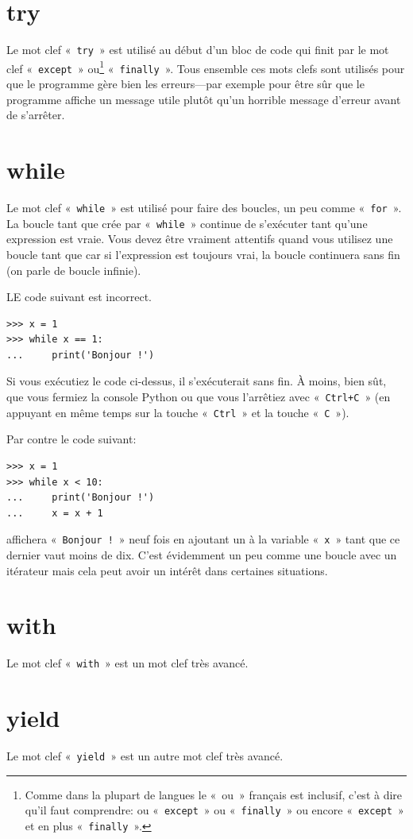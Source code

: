 \section*{try}

Le mot clef « \texttt{try} » est utilisé au début d'un bloc de code qui finit par le mot clef « \texttt{except} » ou\footnote{Comme dans la plupart de langues le « ou » français est inclusif, c'est à dire qu'il faut comprendre: ou « \texttt{except} » ou « \texttt{finally} » ou encore « \texttt{except} » et en plus « \texttt{finally} ».} « \texttt{finally} ». Tous ensemble ces mots clefs sont utilisés pour que le programme gère bien les erreurs---par exemple pour être sûr que le programme affiche un message utile plutôt qu'un horrible message d'erreur avant de s'arrêter.

\section*{while}

Le mot clef « \texttt{while} » est utilisé pour faire des boucles, un peu comme « \texttt{for} ». La boucle tant que crée par « \texttt{while} » continue de s'exécuter tant qu'une expression est vraie. Vous devez être vraiment attentifs quand vous utilisez une boucle tant que car si l'expression est toujours vrai, la boucle continuera sans fin (on parle de boucle infinie).

LE code suivant est incorrect.
\begin{Verbatim}[frame=single,rulecolor=\color{red},label="ne pas taper"]
>>> x = 1
>>> while x == 1:
...     print('Bonjour !')
\end{Verbatim}

Si vous exécutiez le code ci-dessus, il s'exécuterait sans fin. À moins, bien sût, que vous fermiez la console  Python ou que vous l'arrêtiez avec « \texttt{Ctrl+C} » (en appuyant en même temps sur la touche « \texttt{Ctrl} » et la touche « \texttt{C} »).


Par contre le code suivant:

\begin{Verbatim}[frame=single,rulecolor=\color{gray}]
>>> x = 1
>>> while x < 10:
...     print('Bonjour !')
...     x = x + 1
\end{Verbatim}

affichera « \texttt{Bonjour !} » neuf fois en ajoutant un à la variable « \texttt{x} » tant que ce dernier vaut moins de dix. C'est évidemment un peu comme une boucle avec un itérateur mais cela peut avoir un intérêt dans certaines situations.

\section*{with}
Le mot clef « \texttt{with} » est un mot clef très avancé. 

\section*{yield}
Le mot clef « \texttt{yield} » est un autre mot clef très avancé. 

\newpage